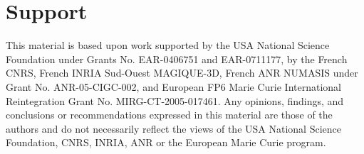 \section{Support}

This material is based upon work supported by the USA National Science
Foundation under Grants No. EAR-0406751 and EAR-0711177, by the French
CNRS, French INRIA Sud-Ouest MAGIQUE-3D, French ANR NUMASIS under
Grant No. ANR-05-CIGC-002, and European FP6 Marie Curie International
Reintegration Grant No. MIRG-CT-2005-017461. Any opinions, findings,
and conclusions or recommendations expressed in this material are
those of the authors and do not necessarily reflect the views of the
USA National Science Foundation, CNRS, INRIA, ANR or the European
Marie Curie program.

